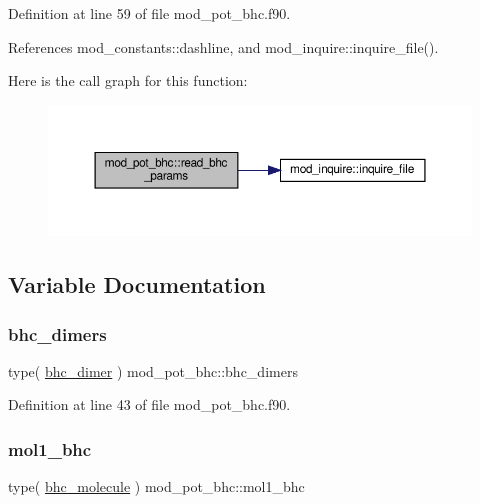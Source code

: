 Definition at line 59 of file mod\+\_\+pot\+\_\+bhc.\+f90.



References mod\+\_\+constants\+::dashline, and mod\+\_\+inquire\+::inquire\+\_\+file().

Here is the call graph for this function\+:
\nopagebreak
\begin{figure}[H]
\begin{center}
\leavevmode
\includegraphics[width=350pt]{namespacemod__pot__bhc_ab1ca15618078c0662d799fc22b126e17_cgraph}
\end{center}
\end{figure}


\subsection{Variable Documentation}
\mbox{\label{namespacemod__pot__bhc_a3fcd8470e5904559d0c2c3dd1a517d2d}} 
\subsubsection{\texorpdfstring{bhc\+\_\+dimers}{bhc\_dimers}}
{\footnotesize\ttfamily type( \hyperlink{structmod__pot__bhc_1_1bhc__dimer}{bhc\+\_\+dimer} ) mod\+\_\+pot\+\_\+bhc\+::bhc\+\_\+dimers}



Definition at line 43 of file mod\+\_\+pot\+\_\+bhc.\+f90.

\mbox{\label{namespacemod__pot__bhc_a1624e56c037fde88375d7844e2846ab2}} 
\subsubsection{\texorpdfstring{mol1\+\_\+bhc}{mol1\_bhc}}
{\footnotesize\ttfamily type( \hyperlink{structmod__pot__bhc_1_1bhc__molecule}{bhc\+\_\+molecule} ) mod\+\_\+pot\+\_\+bhc\+::mol1\+\_\+bhc}



